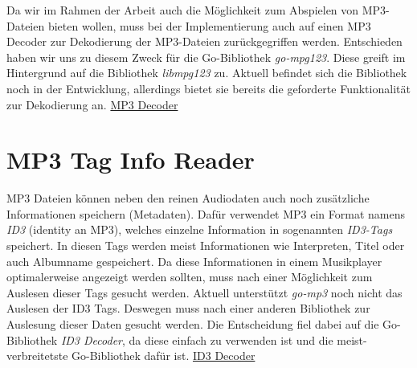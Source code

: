 Da wir im Rahmen der Arbeit auch die Möglichkeit zum Abspielen von MP3-Dateien
bieten wollen, muss bei der Implementierung auch auf einen MP3 Decoder zur
Dekodierung der MP3-Dateien zurückgegriffen werden. Entschieden haben wir uns
zu diesem Zweck für die Go-Bibliothek \textit{go-mpg123}. Diese greift im
Hintergrund auf die Bibliothek \textit{libmpg123} zu. Aktuell befindet sich die Bibliothek
noch in der Entwicklung, allerdings bietet sie bereits die geforderte
Funktionalität zur Dekodierung an.
\href{https://github.com/bobertlo/go-mpg123}{MP3 Decoder}

\section{MP3 Tag Info Reader}
MP3 Dateien können neben den reinen Audiodaten auch noch zusätzliche
Informationen speichern (Metadaten). Dafür verwendet MP3 ein Format namens
\textit{ID3} (identity an MP3), welches einzelne Information in
sogenannten \textit{ID3-Tags} speichert. In diesen Tags werden meist
Informationen wie Interpreten, Titel oder auch Albumname gespeichert. Da diese
Informationen in einem Musikplayer optimalerweise angezeigt werden sollten,
muss nach einer Möglichkeit zum Auslesen dieser Tags gesucht werden. \hfill
\break
Aktuell unterstützt \textit{go-mp3} noch nicht das Auslesen der ID3 Tags.
Deswegen muss nach einer anderen Bibliothek zur Auslesung dieser Daten gesucht
werden. Die Entscheidung fiel dabei auf die Go-Bibliothek \textit{ID3 Decoder},
da diese einfach zu verwenden ist und die meist-verbreitetste Go-Bibliothek
dafür ist.
\href{https://github.com/mikkyang/id3-go}{ID3 Decoder}
